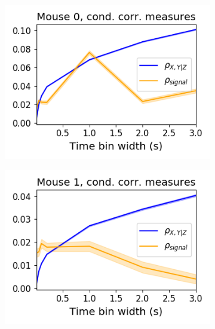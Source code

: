   \begin{figure}[h]
    \begin{subfigure}[h]{0.5\linewidth}
      \includegraphics[width=\linewidth]{figures/eight_probe/Krebs_cond_corr_comparison.png}
      \label{fig:Krebs_cond_corr_comparison}
    \end{subfigure}
    \begin{subfigure}[h]{0.5\linewidth}
      \includegraphics[width=\linewidth]{figures/eight_probe/Waksman_cond_corr_comparison.png}
      \label{fig:Waksman_cond_corr_comparison}
    \end{subfigure}
    \begin{subfigure}[h]{0.5\linewidth}

\end{subfigure}
\end{figure}

